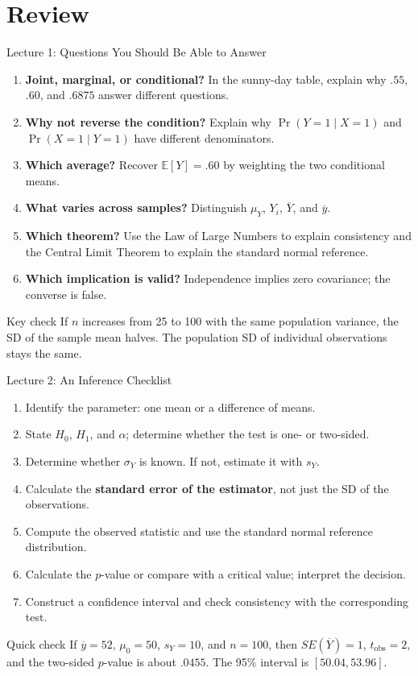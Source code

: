 \documentclass[10pt,aspectratio=169]{beamer}
\newcommand{\E}{\mathbb{E}}
\newcommand{\Prb}{\operatorname{Pr}}
\begin{document}
\section{Review}
\begin{frame}{Lecture 1: Questions You Should Be Able to Answer}
\small
\begin{enumerate}
\item \textbf{Joint, marginal, or conditional?}
In the sunny-day table, explain why $.55$, $.60$, and $.6875$ answer different questions.
\item \textbf{Why not reverse the condition?}
Explain why $\Prb(Y=1\mid X=1)$ and $\Prb(X=1\mid Y=1)$ have different denominators.
\item \textbf{Which average?}
Recover $\E[Y]=.60$ by weighting the two conditional means.
\item \textbf{What varies across samples?}
Distinguish $\mu_Y$, $Y_i$, $\overline Y$, and $\overline y$.
\item \textbf{Which theorem?}
Use the Law of Large Numbers to explain consistency and the Central Limit Theorem to explain the standard normal reference.
\item \textbf{Which implication is valid?}
Independence implies zero covariance; the converse is false.
\end{enumerate}
\begin{block}{Key check}
If $n$ increases from 25 to 100 with the same population variance, the SD of the sample mean halves. The population SD of individual observations stays the same.
\end{block}
\end{frame}

\begin{frame}{Lecture 2: An Inference Checklist}
\begin{enumerate}
\item Identify the parameter: one mean or a difference of means.
\item State $H_0$, $H_1$, and $\alpha$; determine whether the test is one- or two-sided.
\item Determine whether $\sigma_Y$ is known. If not, estimate it with $s_Y$.
\item Calculate the \textbf{standard error of the estimator}, not just the SD of the observations.
\item Compute the observed statistic and use the standard normal reference distribution.
\item Calculate the $p$-value or compare with a critical value; interpret the decision.
\item Construct a confidence interval and check consistency with the corresponding test.
\end{enumerate}
\begin{block}{Quick check}
If $\overline y=52$, $\mu_0=50$, $s_Y=10$, and $n=100$, then
$SE(\overline Y)=1$, $t_{\mathrm{obs}}=2$, and the two-sided $p$-value is about $.0455$. The 95\% interval is $[50.04,53.96]$.
\end{block}
\end{frame}
\end{document}
